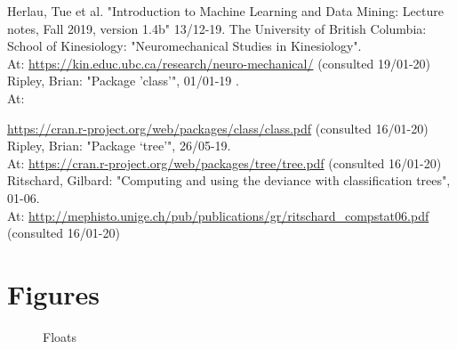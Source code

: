 \documentclass[11pt,fleqn]{article}
\begin{document}
\begin{thebibliography}{9}
	 Herlau, Tue et al. "Introduction to Machine Learning and Data Mining: Lecture notes, Fall 2019, version 1.4b" 13/12-19.
		 The University of British Columbia: School of Kinesiology:
	"Neuromechanical Studies in Kinesiology". \\
	At:
	\url{https://kin.educ.ubc.ca/research/neuro-mechanical/} (consulted 19/01-20)
	 Ripley, Brian: "Package ’class’", 01/01-19 .\\
	At:
	
	\url{https://cran.r-project.org/web/packages/class/class.pdf} (consulted 16/01-20)
	 Ripley, Brian: "Package ‘tree’", 26/05-19.\\ At: \url{https://cran.r-project.org/web/packages/tree/tree.pdf} (consulted 16/01-20)
	 Ritschard, Gilbard: "Computing and using the deviance with classification trees", 01-06.\\
	 At:
	\url{http://mephisto.unige.ch/pub/publications/gr/ritschard_compstat06.pdf} (consulted 16/01-20)

\end{thebibliography}
\appendix
\section{Figures}
\begin{figure}[H]
	
	\centering
	\caption{Floats}
	\label{fig:2dtrajects}
\end{figure}
\end{document}

